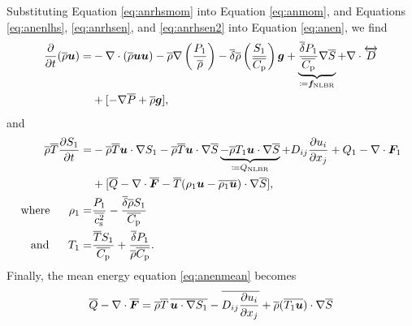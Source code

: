 \documentclass[12pt]{article}
\newcommand{\vecf}{\bm{F}}
\begin{document}
Substituting Equation \eqref{eq:anrhsmom} into Equation \eqref{eq:anmom}, and Equations \eqref{eq:anenlhs}, \eqref{eq:anrhsen}, and \eqref{eq:anrhsen2} into Equation \eqref{eq:anen}, we find
	\begin{align}\label{eq:anmommod}
		\frac{\partial}{\partial t}(\overline{\rho}\bm{u})= &-\nabla\cdot(\overline{\rho}\bm{u}\bm{u}) -\overline{\rho}\nabla\left(\frac{P_1}{\overline{\rho}}\right) - \overline{\delta} \overline{\rho} \left(\frac{S_1}{\overline{C_{\rm{p}}}}\right) \bm{g} + \underbrace{\frac{\overline{\delta} P_1}{\overline{C_{\rm{p}}}} \nabla\overline{S}}_{\coloneqq \bm{f}_{\rm NLBR}}+\nabla\cdot \overleftrightarrow{D}\nonumber\\
		&+[-\nabla\overline{P} + \overline{\rho}\bm{g}],
	\end{align}
and
\begin{subequations}\label{eq:anenmod}
\begin{align}
	\rhoover\tmpover\pderiv{\entrone}{t}= &-\rhoover\tmpover\ugrad \entrone - \rhoover \tmpover \ugrad \entrover \underbrace{- \rhoover \tmpone\ugrad\entrover}_{\define Q_{\rm NLBR}}+D_{ij}\pderiv{u_i}{x_j} + Q _1- \Div\vecf_1  \nonumber\\
	& +[\heatover - \Div\overline{\vecf} - \tmpover(\rhoone\vecu-\overline{\rhoone\vecu})\cdot\nabla\entrover],\\
	\where \rhoone =& \frac{\prsone}{\cssqover}-\frac{\deltaover\rhoover \entrone}{\cpover}\\
	\andd \tmpone = & \frac{\tmpover \entrone}{\cpover} + \frac{\deltaover \prsone}{\rhoover\cpover}.
\end{align}
\end{subequations}
Finally, the mean energy equation \eqref{eq:anenmean} becomes
\begin{align}\label{eq:anenmean2}
	\heatover-\Div\overline{\vecf} = \rhoover\tmpover\, \overline{\ugrad \entrone}-\overline{D_{ij}\pderiv{u_i}{x_j}} + \rhoover (\overline{\tmpone\vecu})\dotgrad\entrover 
\end{align}
\end{document}
